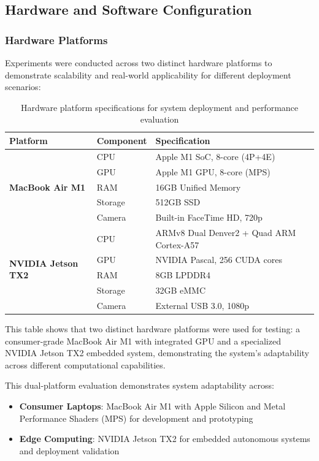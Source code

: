 \documentclass[12pt,oneside]{book}
\begin{document}
\subsection{Hardware and Software Configuration}

\subsubsection{Hardware Platforms}

Experiments were conducted across two distinct hardware platforms to demonstrate scalability and real-world applicability for different deployment scenarios:

\begin{table}[ht]
\centering
\caption{Hardware platform specifications for system deployment and performance evaluation}
\label{tab:hardware_config}
\begin{tabular}{@{}lll@{}}
\toprule
\textbf{Platform} & \textbf{Component} & \textbf{Specification} \\
\midrule
\multirow{5}{*}{\textbf{MacBook Air M1}} & CPU & Apple M1 SoC, 8-core (4P+4E) \\
 & GPU & Apple M1 GPU, 8-core (MPS) \\
 & RAM & 16GB Unified Memory \\
 & Storage & 512GB SSD \\
 & Camera & Built-in FaceTime HD, 720p \\
\midrule
\multirow{5}{*}{\textbf{NVIDIA Jetson TX2}} & CPU & ARMv8 Dual Denver2 + Quad ARM Cortex-A57 \\
 & GPU & NVIDIA Pascal, 256 CUDA cores \\
 & RAM & 8GB LPDDR4 \\
 & Storage & 32GB eMMC \\
 & Camera & External USB 3.0, 1080p \\
\bottomrule
\end{tabular}
\end{table}

This table shows that two distinct hardware platforms were used for testing:
a consumer-grade MacBook Air M1 with integrated GPU and a specialized NVIDIA Jetson TX2 embedded system, demonstrating the system's adaptability across different computational capabilities.

This dual-platform evaluation demonstrates system adaptability across:
\begin{itemize}
\item \textbf{Consumer Laptops}: MacBook Air M1 with Apple Silicon and Metal Performance Shaders (MPS) for development and prototyping
\item \textbf{Edge Computing}: NVIDIA Jetson TX2 for embedded autonomous systems and deployment validation
\end{itemize}
\end{document}
